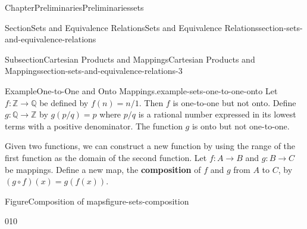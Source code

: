 \documentclass[oneside,10pt,]{book}
\newcommand{\terminology}[1]{\textbf{#1}}
\numberwithin{equation}{section}
\begin{document}
\begin{chapterptx}{Chapter}{Preliminaries}{}{Preliminaries}{}{}{sets}
\begin{sectionptx}{Section}{Sets and Equivalence Relations}{}{Sets and Equivalence Relations}{}{}{section-sets-and-equivalence-relations}
\begin{subsectionptx}{Subsection}{Cartesian Products and Mappings}{}{Cartesian Products and Mappings}{}{}{section-sets-and-equivalence-relations-3}
\begin{example}{Example}{One-to-One and Onto Mappings.}{example-sets-one-to-one-onto}
Let \(f:{\mathbb Z} \rightarrow {\mathbb Q}\) be defined by \(f(n) = n/1\).  Then \(f\) is one-to-one but not onto.  Define \(g : {\mathbb Q} \rightarrow {\mathbb Z}\) by \(g(p/q) = p\) where \(p/q\) is a rational number expressed in its lowest terms with a positive denominator.  The function \(g\) is onto but not one-to-one.%
\end{example}
Given two functions, we can construct a new function by using the range of the first function as the domain of the second function.  Let \(f : A \rightarrow B\) and \(g : B \rightarrow C\) be mappings.  Define a new map, the \terminology{composition} of \(f\) and \(g\) from \(A\) to \(C\), by \((g \circ f)(x) = g(f(x))\).%
\begin{figureptx}{Figure}{Composition of maps}{figure-sets-composition}{}%
\begin{image}{0}{1}{0}{}%
\end{image}
\end{figureptx}
\end{subsectionptx}
\end{sectionptx}
\end{chapterptx}
\end{document}
